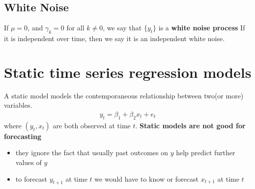 \documentclass[a4paper,twoside,11pt]{article}
\begin{document}
\begin{shaded*}
\section{White Noise}
\noindent If $\mu=0$, and $\gamma_k =0$ for all $k \ne 0$, we say that $\{y_t\}$ is a \textbf{white noise process}
\newline
\newline
If it is independent over time, then we say it is an independent white noise.
\end{shaded*}
\section{Static time series regression models}
\noindent A static model models the contemporaneous relationship between two(or more) variables. 
\begin{equation*}
\begin{aligned}
    y_t = \beta_1 + \beta_2 x_t + e_t
\end{aligned}
\end{equation*}
where $(y_t,x_t)$ are both observed at time $t$. 
\newline
\textcolor{NavyBlue}{\textbf{Static models are not good for forecasting}}
\begin{itemize}
    \item they ignore the fact that usually past outcomes on $y$ help predict further values of $y$
    \item to forecast $y_{t+1}$ at time $t$ \textcolor{NavyBlue}{we would have to know or forecast $x_{t+1}$ at time $t$}
\end{itemize}
\end{document}
